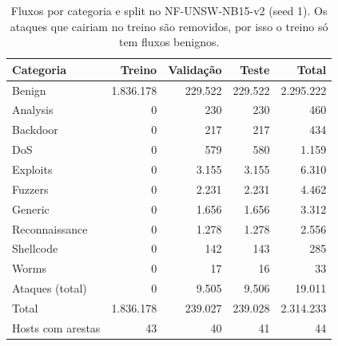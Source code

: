 \begin{table}[ht]
\centering
\caption{Fluxos por categoria e split no NF-UNSW-NB15-v2 (seed 1). Os ataques que cairiam no treino são removidos, por isso o treino só tem fluxos benignos.}
\label{tab:split-nf-unsw-nb15-v2}
\begin{tabular}{lrrrr}
\toprule
Categoria & Treino & Validação & Teste & Total \\
\midrule
Benign & 1.836.178 & 229.522 & 229.522 & 2.295.222 \\
Analysis & 0 & 230 & 230 & 460 \\
Backdoor & 0 & 217 & 217 & 434 \\
DoS & 0 & 579 & 580 & 1.159 \\
Exploits & 0 & 3.155 & 3.155 & 6.310 \\
Fuzzers & 0 & 2.231 & 2.231 & 4.462 \\
Generic & 0 & 1.656 & 1.656 & 3.312 \\
Reconnaissance & 0 & 1.278 & 1.278 & 2.556 \\
Shellcode & 0 & 142 & 143 & 285 \\
Worms & 0 & 17 & 16 & 33 \\
Ataques (total) & 0 & 9.505 & 9.506 & 19.011 \\
Total & 1.836.178 & 239.027 & 239.028 & 2.314.233 \\
Hosts com arestas & 43 & 40 & 41 & 44 \\
\bottomrule
\end{tabular}
\end{table}
